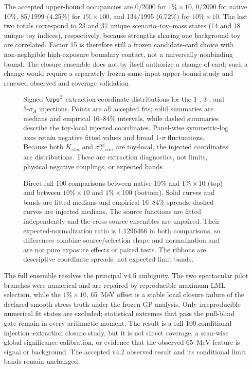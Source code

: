 The accepted upper-bound occupancies are 0/2000 for $1\%\times10$, 0/2000 for
native 10\%, 85/1999 (4.25\%) for $1\%\times100$, and 134/1995 (6.72\%) for
$10\%\times10$.  The last two totals correspond to 23 and 37 unique
scenario--toy--mass states (14 and 18 unique toy indices), respectively, because
strengths sharing one background toy are correlated.  Factor 15 is therefore still a frozen candidate-card choice with
non-negligible high-exposure boundary contact, not a universally nonbinding bound.
The closure ensemble does not by itself authorize a change of card: such a change
would require a separately frozen same-input upper-bound study and renewed observed
and coverage validation.

\begin{figure}[p]
\centering
{}
\caption{Signed $\eps^2$ extraction-coordinate distributions for the 1-, 3-, and
5-$\sigma_A$ injections.  Points are all accepted fits; solid summaries are medians
and empirical 16--84\% intervals, while dashed summaries describe the toy-local
injected coordinates.  Panel-wise symmetric-log axes retain negative fitted values
and broad 1-$\sigma$ fluctuations.  Because both $K_{stm}$ and
$\sigma^{\mathrm{ref}}_{A,stm}$ are toy-local, the injected coordinates are
distributions.  These are extraction diagnostics, not limits, physical negative
couplings, or expected bands.}
\label{fig:v501-v4p6-eps2-distributions}
\end{figure}

\begin{figure}[p]
\centering
{}
\caption{Direct full-100 comparisons between native 10\% and $1\%\times10$ (top)
and between $10\%\times10$ and $1\%\times100$ (bottom).  Solid curves and bands are
fitted medians and empirical 16--84\% spreads; dashed curves are injected medians.
The source functions are fitted independently and the cross-source ensembles are
unpaired.  Their expected-normalization ratio is 1.1296466 in both comparisons, so
differences combine source/selection shape and normalization and are not pure exposure
effects or paired tests.  The ribbons are descriptive coordinate spreads, not
expected-limit bands.}
\label{fig:v501-v4p6-direct-eps2-comparisons}
\end{figure}

\clearpage
The full ensemble resolves the principal v4.5 ambiguity.  The two spectacular pilot
branches were numerical and are repaired by reproducible maximum-LML selection, while
the $1\%\times10$, 65~MeV offset is a stable local closure failure of the declared
smooth stress truth under the frozen GP analysis.  Only irreproducible numerical fit
states are excluded; statistical extremes that pass the pull-blind gate remain in every
arithmetic moment.
The result is a full-100 conditional injection--extraction closure study, but it is
not direct \CLs{} coverage, a scan-wise global-significance calibration, or evidence
that the observed 65~MeV feature is signal or background.  The accepted v4.2 observed
result and its conditional limit bands remain unchanged.

